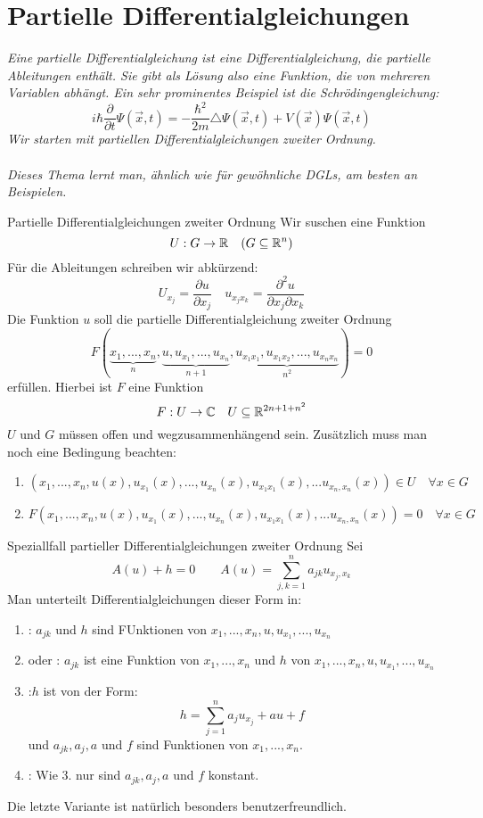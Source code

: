 \newpage
\section[Partielle Differentialgleichungen]{Partielle Differentialgleichungen}
\textit{Eine partielle Differentialgleichung ist eine Differentialgleichung, die partielle Ableitungen enthält. Sie gibt als Lösung also eine Funktion, die von mehreren Variablen abhängt. Ein sehr prominentes Beispiel ist die Schrödingengleichung:
$$i\hbar\frac{\partial}{\partial t}\Psi(\vec{x},t)=-\frac{\hbar^2}{2m}\triangle \Psi(\vec{x},t)+V(\vec{x})\Psi(\vec{x},t)$$
Wir starten mit partiellen Differentialgleichungen zweiter Ordnung. \\ \\
Dieses Thema lernt man, ähnlich wie für gewöhnliche DGLs, am besten an Beispielen.}
\begin{Def}{Partielle Differentialgleichungen zweiter Ordnung}
Wir suschen eine Funktion
$$U:G\rightarrow \mathbb{R} \quad (G\subseteq \mathbb{R}^n)$$
Für die Ableitungen schreiben wir abkürzend:
$$U_{x_j}=\frac{\partial u}{\partial x_j}\quad u_{x_jx_k}=\frac{\partial^2 u}{\partial x_j \partial x_k}$$
Die Funktion $u$ soll die partielle Differentialgleichung zweiter Ordnung
$$F(\underbrace{x_1,...,x_n}_n,\underbrace{u, u_{x_1},...,u_{x_n}}_{n+1}, \underbrace{u_{x_1x_1}, u_{x_1x_2},...,u_{x_nx_n}}_{n^2})=0$$
erfüllen. Hierbei ist $F$ eine Funktion
$$F: U\rightarrow \mathbb{C} \quad U\subseteq \mathbb{R}^{2n+1+n^2}$$
$U$ und $G$ müssen offen und wegzusammenhängend sein. Zusätzlich muss man noch eine Bedingung beachten:
\begin{enumerate}
    \item $(x_1,...,x_n, u(x), u_{x_1}(x),...,u_{x_n}(x), u_{x_1x_1}(x),...u_{x_n,x_n}(x))\in U \quad \forall x\in G$
    \item $F(x_1,...,x_n, u(x), u_{x_1}(x),...,u_{x_n}(x), u_{x_1x_1}(x),...u_{x_n,x_n}(x))=0 \quad \forall x\in G$
\end{enumerate}
\end{Def}
\begin{Def}{Speziallfall partieller Differentialgleichungen zweiter Ordnung}
Sei
$$A(u)+h=0 \qquad A(u)=\sum_{j,k=1}^n a_{jk}u_{x_j,x_k}$$
Man unterteilt Differentialgleichungen dieser Form in:
\begin{enumerate}
    \item {}: $a_{jk}$ und $h$ sind FUnktionen von $x_1,...,x_n, u, u_{x_1},...,u_{x_n}$
    \item {} oder : $a_{jk}$ ist eine Funktion von $x_1,...,x_n$ und $h$ von $x_1,...,x_n, u, u_{x_1},...,u_{x_n}$
    \item {}:$h$ ist von der Form:
    $$h=\sum_{j=1}^n a_ju_{x_j}+au+f$$
    und $a_{jk}, a_j, a$ und $f$ sind Funktionen von $x_1, ..., x_n$.
    \item {}: Wie 3. nur sind $a_{jk}, a_j, a$ und $f$ konstant.
\end{enumerate}
\end{Def}
Die letzte Variante ist natürlich besonders benutzerfreundlich.

